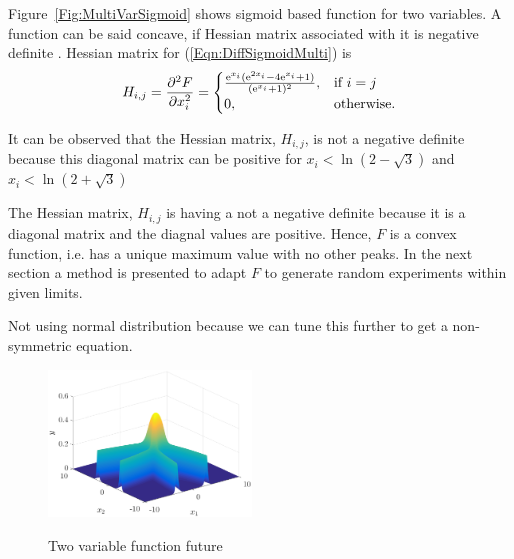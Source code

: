 \documentclass[twocolumn]{svjour3}          %
\newcommand{\me}{\mathrm{e}}
\begin{document}
Figure~\ref{Fig:MultiVarSigmoid} shows sigmoid based function for two variables. A function can be said concave, if Hessian matrix associated with it is negative definite \cite{bernstein1962some}. Hessian matrix for (\ref{Eqn:DiffSigmoidMulti}) is 
\begin{eqnarray}
H_{i,j} = \pdv[2]{F}{x_i} =
\begin{cases}
\frac{\me^{x_i}(\me^{2x_i}-4\me^{x_i}+1)}{(\me^{x_i}+1)^2},& \text{if } i = j\\
0,              & \text{otherwise.}
\end{cases} \label{Eqn:HessianMatrix}
\end{eqnarray}
\par
It can be observed that the Hessian matrix, $H_{i,j}$, is not a negative definite because this diagonal matrix can be positive for $x_i<\ln({2-\sqrt{3}})$ and $x_i<\ln({2+\sqrt{3}})$
\par
The Hessian matrix, $H_{i,j}$ is having a not a negative definite because it is a diagonal matrix and the diagnal values are positive. Hence, $F$ is a convex function, i.e. has a unique maximum value with no other peaks. In the next section a method is presented to adapt $F$ to generate random experiments within given limits.
\par
Not using normal distribution because we can tune this further to get a non-symmetric equation.
\begin{figure}
	\centering
	\includegraphics[width=0.48\textwidth]{images/2FactorsSigmoidFuture}
	\label{Fig:TwoVarFutureFunc}
	\caption{Two variable function future}
\end{figure}
\end{document}
